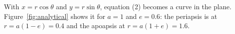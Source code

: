 With $x = r\cos\theta$ and $y = r\sin\theta$, equation (2) becomes a curve
in the plane.
Figure~\ref{fig:analytical} shows it for $a = 1$ and $e = 0.6$:
the periapsis is at $r = a(1-e) = 0.4$ and the apoapsis at $r = a(1+e) = 1.6$.

